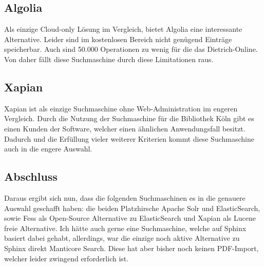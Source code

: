 \subsection{Algolia}

Als einzige Cloud-only Lösung im Vergleich, bietet Algolia eine interessante Alternative. Leider sind im kostenlosen Bereich nicht genügend Einträge speicherbar. Auch sind 50.000 Operationen zu wenig für die das Dietrich-Online. Von daher fällt diese Suchmaschine durch diese Limitationen raus.

\subsection{Xapian}

Xapian ist als einzige Suchmaschine ohne Web-Administration im engeren Vergleich. Durch die Nutzung der Suchmaschine für die Bibliothek Köln gibt es einen Kunden der Software, welcher einen ähnlichen Anwendungsfall besitzt. \cite{Xapian.2019} Dadurch und die Erfüllung vieler weiterer Kriterien kommt diese Suchmaschine auch in die engere Auswahl.

\subsection{Abschluss}

Daraus ergibt sich nun, dass die folgenden Suchmaschinen es in die genauere Auswahl geschafft haben: die beiden Platzhirsche Apache Solr und ElasticSearch, sowie Fess als Open-Source Alternative zu ElasticSearch und Xapian als Lucene freie Alternative. Ich hätte auch gerne eine Suchmaschine, welche auf Sphinx basiert dabei gehabt, allerdings, war die einzige noch aktive Alternative zu Sphinx direkt Manticore Search. Diese hat aber bisher noch keinen PDF-Import, welcher leider zwingend erforderlich ist. 


